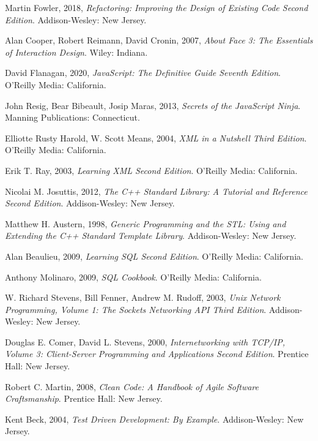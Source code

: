 \begin{thebibliography}{99}
Martin Fowler, 2018,
\emph{Refactoring: Improving the Design of Existing Code Second Edition}.
Addison-Wesley: New Jersey.

Alan Cooper, Robert Reimann, David Cronin, 2007,
\emph{About Face 3: The Essentials of Interaction Design}.
Wiley: Indiana.

David Flanagan, 2020,
\emph{JavaScript: The Definitive Guide Seventh Edition}.
O'Reilly Media: California.

John Resig, Bear Bibeault, Josip Maras, 2013,
\emph{Secrets of the JavaScript Ninja}.
Manning Publications: Connecticut.

Elliotte Rusty Harold, W. Scott Means, 2004,
\emph{XML in a Nutshell Third Edition}.
O'Reilly Media: California.

Erik T. Ray, 2003,
\emph{Learning XML Second Edition}.
O'Reilly Media: California.

Nicolai M. Josuttis, 2012,
\emph{The C++ Standard Library: A Tutorial and Reference Second Edition}.
Addison-Wesley: New Jersey.

Matthew H. Austern, 1998,
\emph{Generic Programming and the STL: Using and Extending the C++ Standard Template Library}.
Addison-Wesley: New Jersey.

Alan Beaulieu, 2009,
\emph{Learning SQL Second Edition}.
O'Reilly Media: California.

Anthony Molinaro, 2009,
\emph{SQL Cookbook}.
O'Reilly Media: California.

W. Richard Stevens, Bill Fenner, Andrew M. Rudoff, 2003,
\emph{Unix Network Programming, Volume 1: The Sockets Networking API Third Edition}.
Addison-Wesley: New Jersey.

Douglas E. Comer, David L. Stevens, 2000,
\emph{Internetworking with TCP/IP, Volume 3: Client-Server Programming and Applications Second Edition}.
Prentice Hall: New Jersey.

Robert C. Martin, 2008,
\emph{Clean Code: A Handbook of Agile Software Craftsmanship}.
Prentice Hall: New Jersey.

Kent Beck, 2004,
\emph{Test Driven Development: By Example}.
Addison-Wesley: New Jersey.


\end{thebibliography}
